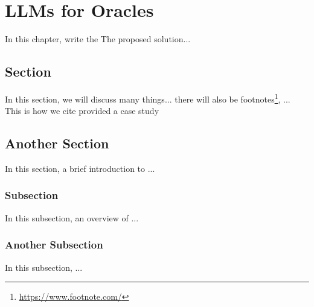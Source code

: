 \chapter{LLMs for Oracles}
\label{cha:llmo}
\vspace{0.4 cm}

In this chapter, write the The proposed solution...


\section{Section}
\label{sec:data}
\vspace{0.2 cm}

In this section, we will discuss many things... there will also be footnotes\footnote{ \url{https://www.footnote.com/} }, ...
This is how we cite\cite{Nguyen2019} provided a case study

\section{Another Section}
\label{sec:timeseries}
\vspace{0.2 cm}

In this section, a brief introduction to ... 

\vspace{0.1 cm}
\subsection{Subsection}
\label{sec:transformers}
\vspace{0.1 cm}

In this subsection, an overview of ...

\vspace{0.1 cm}
\subsection{Another Subsection}
\label{sec:automl}
\vspace{0.1 cm}

In this subsection, ...